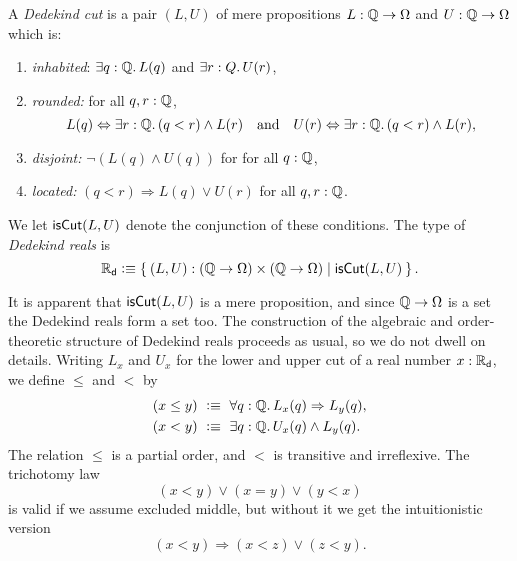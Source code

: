 \begin{defn}
  A \emph{Dedekind cut} is a pair $(L, U)$ of mere propositions $L : \mathbb{Q} \to \Omega$ and $U
  : \mathbb{Q} \to \Omega$ which is:
  \begin{enumerate}
  \item \emph{inhabited}: $\exis{q : \Q} L(q)$ and $\exis{r : Q} U(r)$,
  \item \emph{rounded:} for all $q, r : \mathbb{Q}$,
    \begin{equation*}
      L(q) \Leftrightarrow \exis{r : \Q} (q < r) \land L(r)
      \quad\text{and}\quad
      U(r) \Leftrightarrow \exis{r : \Q} (q < r) \land L(r),
    \end{equation*}
  \item \emph{disjoint:} $\lnot (L(q) \land U(q))$ for for all $q : \mathbb{Q}$,
  \item \emph{located:} $(q < r) \Rightarrow L(q) \lor U(r)$ for all $q, r : \mathbb{Q}$.
  \end{enumerate}
  We let $\mathsf{isCut}(L, U)$ denote the conjunction of these conditions. The type of
  \emph{Dedekind reals} is
  \begin{equation*}
    \RD \defeq \setof{ (L, U) : (\Q \to \Omega) \times (\Q \to \Omega) | \dcut(L,U)}.
  \end{equation*}
\end{defn}

It is apparent that $\mathsf{isCut}(L, U)$ is a mere proposition, and since $\mathbb{Q} \to \Omega$ is a set
the Dedekind reals form a set too. 
%
The construction of the algebraic and order-theoretic structure of Dedekind reals proceeds
as usual, so we do not dwell on details. Writing $L_x$ and $U_x$ for the lower and upper
cut of a real number $x : \mathbb{R}_\mathsf{d}$, we define $\leq$ and $<$ by
%
\begin{align*}
  (x \leq y) &\ \defeq \ \fall{q : \Q} L_x(q) \Rightarrow L_y(q), \\
  (x < y)    &\ \defeq \ \exis{q : \Q} U_x(q) \land L_y(q).
\end{align*}
%
The relation $\leq$ is a partial order, and $<$ is transitive and irreflexive. The
trichotomy law
%
\begin{equation*}
  (x < y) \lor (x = y) \lor (y < x)
\end{equation*}
%
is valid if we assume excluded middle, but without it we get the intuitionistic version
%
\begin{equation*}
  (x < y) \Rightarrow (x < z) \lor (z < y).
\end{equation*}
%


